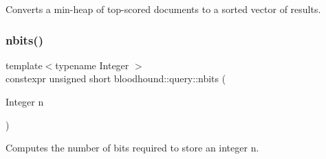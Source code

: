 Converts a min-\/heap of top-\/scored documents to a sorted vector of results. 

\mbox{\label{namespacebloodhound_1_1query_abbedf82d8c97ed0f54a4025105288136}} 
\subsubsection{\texorpdfstring{nbits()}{nbits()}}
{\footnotesize\ttfamily template$<$typename Integer $>$ \\
constexpr unsigned short bloodhound\+::query\+::nbits (\begin{DoxyParamCaption}\item[{Integer}]{n }\end{DoxyParamCaption})}



Computes the number of bits required to store an integer n. 

